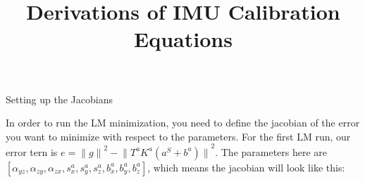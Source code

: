 \documentclass{article}
\title{Derivations of IMU Calibration Equations}
\author{}
\date{}
\begin{document}
\maketitle

\large{Setting up the Jacobians}

In order to run the LM minimization, you need to define the jacobian of the error you want to minimize with respect to the parameters.
For the first LM run, our error tern is $e={\lVert g\rVert}^2-{\lVert T^aK^a(a^S+b^a)\rVert}^2$. The parameters here are $[\alpha_{yz}, \alpha_{zy}, \alpha_{zx}, s^a_x, s^a_y, s^a_z, b^a_x, b^a_y, b^a_z]$, which means the jacobian will look like this:
\end{document}

